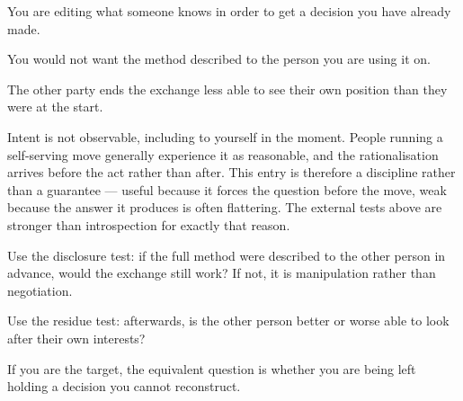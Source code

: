\begin{feedback}
  \item You are editing what someone knows in order to get a decision you have already made.
  \item You would not want the method described to the person you are using it on.
  \item The other party ends the exchange less able to see their own position than they were at the start.
\end{feedback}

\begin{failure}
Intent is not observable, including to yourself in the moment. People running a self-serving move generally experience it as reasonable, and the rationalisation arrives before the act rather than after. This entry is therefore a discipline rather than a guarantee --- useful because it forces the question before the move, weak because the answer it produces is often flattering. The external tests above are stronger than introspection for exactly that reason.
\end{failure}

\begin{countermeasures}
  \item Use the disclosure test: if the full method were described to the other person in advance, would the exchange still work? If not, it is manipulation rather than negotiation.
  \item Use the residue test: afterwards, is the other person better or worse able to look after their own interests?
  \item If you are the target, the equivalent question is whether you are being left holding a decision you cannot reconstruct.
\end{countermeasures}

\seesources
{}
